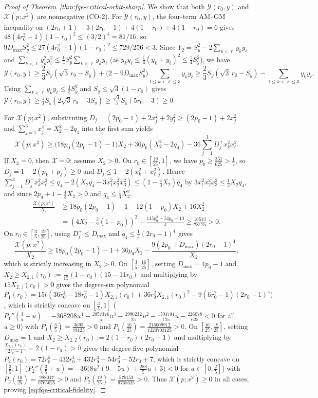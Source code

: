 \begin{proof}[Proof of Theorem~\ref{thm:fqe-critical-orbit-sharp}]
We show that both $\mathcal Y(r_0,y)$ and $\mathcal X(p;x^2)$ are
nonnegative (CO-2). For $\mathcal Y(r_0,y)$, the four-term AM--GM
inequality on $(2r_0+1)+3(2r_0-1)+4(1-r_0)+4(1-r_0)=6$ gives
$48(4r_0^2-1)(1-r_0)^2\le(3/2)^4=81/16$, so
$9D_{\max}S_y^2\le27(4r_0^2-1)(1-r_0)^2\le729/256<3$. Since
$Y_2=S_y^2-2\sum_{k<\ell}y_ky_\ell$ and
$\sum_{k<\ell}y_k^2y_\ell^2\le\tfrac14S_y^2\sum_{k<\ell}y_ky_\ell$
(as $y_ky_\ell\le\tfrac14(y_k+y_\ell)^2\le\tfrac14S_y^2$), we have
\[
 \mathcal Y(r_0,y)\ge\frac23S_y(\sqrt3\,r_0-S_y)
   +\bigl(2-9D_{\max}S_y^2\bigr)\sum_{1\le k<\ell\le3}y_ky_\ell
 \ge\frac23S_y(\sqrt3\,r_0-S_y)-\sum_{1\le k<\ell\le3}y_ky_\ell.
\]
Using $\sum_{k<\ell}y_ky_\ell\le\tfrac13S_y^2$ and
$S_y\le\sqrt3(1-r_0)$ gives
$\mathcal Y(r_0,y)\ge\tfrac13S_y(2\sqrt3\,r_0-3S_y)
\ge\tfrac{\sqrt3}{3}S_y(5r_0-3)\ge0$.

For $\mathcal X(p;x^2)$, substituting
$D_j=(2p_0-1)+2x_j^2+2y_j^2\ge(2p_0-1)+2x_j^2$ and
$\sum_{j=1}^3x_j^4=X_2^2-2q_4$ into the first sum yields
\[
 \mathcal X(p;x^2)\ge\bigl(18p_0(2p_0-1)-1\bigr)X_2+36p_0(X_2^2-2q_4)
   -36\sum_{j=1}^3D_j^+x_k^2x_\ell^2.
\]
If $X_2=0$, then $\mathcal X=0$; assume $X_2>0$. On
$r_0\in[\tfrac{19}{25},1]$, we have $p_0\ge\tfrac{361}{625}>\tfrac12$, so
$D_j=1-2(p_k+p_\ell)\ge0$ and $D_j\le1-2(x_k^2+x_\ell^2)$. Hence
$\sum_{j=1}^3D_j^+x_k^2x_\ell^2\le q_4-2(X_2q_4-3x_1^2x_2^2x_3^2)
\le(1-\tfrac43X_2)q_4$ by $3x_1^2x_2^2x_3^2\le\tfrac13X_2q_4$, and since
$2p_0+1-\tfrac43X_2>0$ and $q_4\le\tfrac13X_2^2$,
\[
\begin{aligned}
 \frac{\mathcal X(p;x^2)}{X_2}&\ge18p_0(2p_0-1)-1-12(1-p_0)X_2+16X_2^2\\
 &=\left(4X_2-\frac32(1-p_0)\right)^2+\frac{135p_0^2-54p_0-13}{4}
 \ge\frac{16573}{78125}>0.
\end{aligned}
\]
On $r_0\in[\tfrac35,\tfrac{19}{25}]$, using $D_j^+\le D_{\max}$ and
$q_4\le\tfrac14(2r_0-1)^4$ gives
\[
 \frac{\mathcal X(p;x^2)}{X_2}\ge18p_0(2p_0-1)-1+36p_0X_2
   -\frac{9(2p_0+D_{\max})(2r_0-1)^4}{X_2},
\]
which is strictly increasing in $X_2>0$. On $[\tfrac35,\tfrac{16}{25}]$,
setting $D_{\max}=4p_0-1$ and
$X_2\ge X_{2,1}(r_0):=\tfrac1{15}(1-r_0)(15-11r_0)$ and multiplying by
$15X_{2,1}(r_0)>0$ gives the degree-six polynomial
$P_1(r_0)=15\bigl((36r_0^4-18r_0^2-1)X_{2,1}(r_0)+36r_0^2X_{2,1}(r_0)^2
-9(6r_0^2-1)(2r_0-1)^4\bigr)$, which is strictly concave on
$[\tfrac35,1]$ ($P_1''(\tfrac35+u)=-368208u^4-\tfrac{2057376}{5}u^3
-\tfrac{2990232}{25}u^2-\tfrac{1591704}{125}u-\tfrac{226078}{625}<0$ for all
$u\ge0$) with $P_1(\tfrac35)=\tfrac{3693}{78125}>0$ and
$P_1(\tfrac{16}{25})=\tfrac{216609912}{1220703125}>0$. On
$[\tfrac{16}{25},\tfrac{19}{25}]$, setting $D_{\max}=1$ and
$X_2\ge X_{2,2}(r_0):=2(1-r_0)(2r_0-1)$ and multiplying by
$\frac{X_{2,2}(r_0)}{2r_0-1}=2(1-r_0)>0$ gives the degree-five polynomial
$P_2(r_0)=72r_0^5-432r_0^4+432r_0^3-54r_0^2-52r_0+7$, which is strictly
concave on $[\tfrac35,1]$
($P_2''(\tfrac35+u)=-36\bigl(8u^2(9-5u)+\tfrac{288}{5}u+3\bigr)<0$ for
$u\in[0,\tfrac25]$) with $P_2(\tfrac{16}{25})=\tfrac{988047}{9765625}>0$
and $P_2(\tfrac{19}{25})=\tfrac{570453}{9765625}>0$. Thus
$\mathcal X(p;x^2)\ge0$ in all cases, proving \eqref{eq:fqe-critical-fidelity}.


\end{proof}
